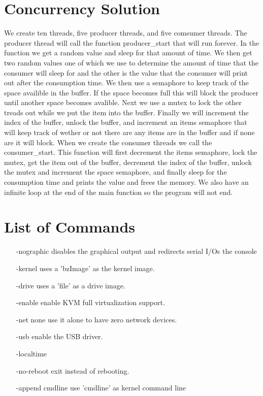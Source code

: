\documentclass[letterpaper,10pt,titlepage]{article}
\begin{document}
\section{Concurrency Solution}
We create ten threads, five producer threads, and five comsumer threads. The
producer thread will call the function producer\_start that will run forever.
In the function we get a random value and sleep for that amount of time. We then
get two random values one of which we use to determine the amount of time that
the consumer will sleep for and the other is the value that the consumer will
print out after the consumption time. We then use a semaphore to keep track 
of the space availible in the buffer. If the space becomes full this will 
block the producer until another space becomes avalible. Next we use a mutex
to lock the other treads out while we put the item into the buffer. Finally we
will increment the index of the buffer, unlock the buffer, and increment an 
items semaphore that will keep track of wether or not there are any items are 
in the buffer and if none are it will block. When we create the consumer 
threads we call the consumer\_start. This function will first decrement the 
items semaphore, lock the mutex, get the item out of the buffer, decrement the 
index of the buffer, unlock the mutex and increment the space semaphore, and 
finally sleep for the consumption time and prints the value and frees the 
memory. We also have an infinite loop at the end of the main function so the 
program will not end.

\section{List of Commands}
\begin{enumerate}
   \item[-nographic] disables the graphical output and redirects serial I/Os the console
   \item[-kernel] uses a 'bzImage' as the kernel image.
   \item[-drive] uses a 'file' as a drive image.
   \item[-enable] enable KVM full virtualization support.
   \item[-net none] use it alone to have zero network devices.
   \item[-usb] enable the USB driver.
   \item[-localtime] 
   \item[-no-reboot] exit instead of rebooting.
   \item[-append] cmdline use 'cmdline' as kernel command line
\end{enumerate}
\end{document}
